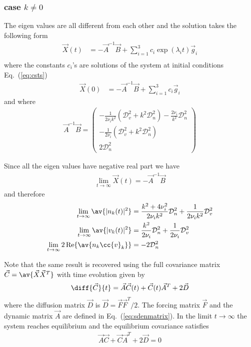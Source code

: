 \documentclass[10pt,a4paper]{article}
\newcommand{\eq}[1]{Eq.~(#1)}
\newcommand{\src}{\ensuremath{\mathcal{D}}}
\begin{document}
\subsubsection{case $k\neq0$}
The eigen values are all different from each other and the solution takes the following form
\begin{align}
\vec{X}(t)&=-\vec{A}^{-1}\vec{B}+\sum_{i=1}^3 c_i\exp(\lambda_it)\vec{g}_i\label{eq:sde2ak0}\\
\end{align}
where the constants $c_i$'s are solutions of the system at initial conditions \eq{\ref{eq:csts}}
\begin{align}
\vec{X}(0)&=-\vec{A}^{-1}\vec{B}+\sum_{i=1}^3 c_i\vec{g}_i\label{eq:csts}
\end{align}
and where
\begin{align}
\vec{A}^{-1} \vec{B} = \left(\begin{array}{l}
-\displaystyle\frac{1}{2\nu_ik^2}\left(\src_v^2+k^2\src_n^2\right)-
\frac{2\nu_i}{k^2}\src_n^2\\
-\displaystyle\frac{1}{2\nu_i}\left(\src_v^2+k^2\src_n^2\right)\\
\displaystyle2\src_n^2
\end{array}\right)
\end{align}

Since all the eigen values have negative real part we have
\begin{align}
\lim_{t\rightarrow\infty} \vec{X}(t) = -\vec{A}^{-1} \vec{B}
\end{align}
and therefore
\begin{align}
\lim_{t\rightarrow\infty} \av{|n_k(t)|^2} &= 
\frac{k^2+4\nu_i^2}{2\nu_ik^2}\src_n^2+\frac{1}{2\nu_ik^2}\src_v^2\\
\lim_{t\rightarrow\infty} \av{|v_k(t)|^2} &= 
\frac{k^2}{2\nu_i}\src_n^2+\frac{1}{2\nu_i}\src_v^2\\
\lim_{t\rightarrow\infty} 2\Re\av{n_k\cc{v}_k} &= -2\src_n^2
\end{align}

Note that the same result is recovered using the full covariance matrix 
$\vec{C}=\av{\vec{X}\vec{X}^T}$ with time evolution given by \citep{weiss:2003}
\begin{align}
\diff{\vec{C}}{t} = \vec{A} \vec{C} (t) + \vec{C} (t) \vec{A}^T + 2 \vec{D}
\end{align}
where the diffusion matrix $\vec{D}$ is $\vec{D}=\vec{F}\vec{F}^T/2$. The forcing matrix
$\vec{F}$ and the dynamic matrix $\vec{A}$ are defined in \eq{\ref{eq:sdenmatrix}}.
In the limit $t\rightarrow\infty$ the system reaches equilibrium and the equilibrium covariance
satisfies
\begin{align}
\vec{A} \vec{C} + \vec{C}  \vec{A}^T + 2 \vec{D} = 0
\end{align}
\end{document}
